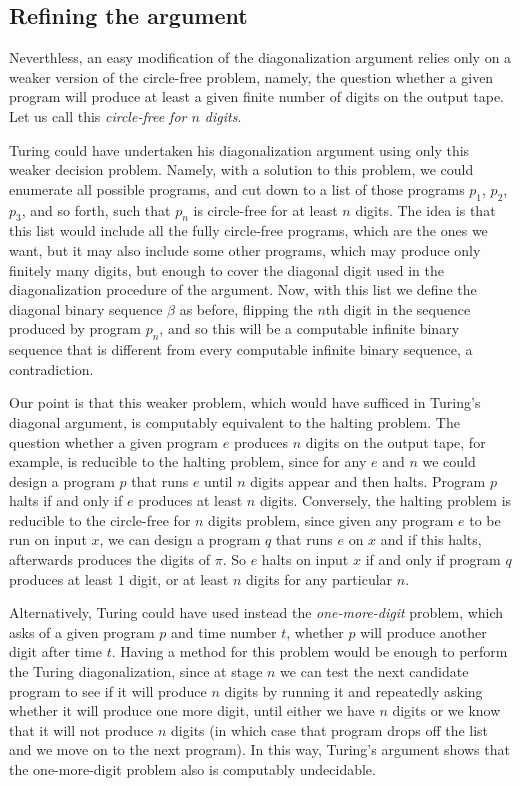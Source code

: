 \documentclass{amsart}
\begin{document}
\subsection{Refining the argument}

Neverthless, an easy modification of the diagonalization argument relies only on a weaker version of the circle-free problem, namely, the question whether a given program will produce at least a given finite number of digits on the output tape. Let us call this \emph{circle-free for $n$ digits}. 

Turing could have undertaken his diagonalization argument using only this weaker decision problem. Namely, with a solution to this problem, we could enumerate all possible programs, and cut down to a list of those programs $p_1$, $p_2$, $p_3$, and so forth, such that $p_n$ is circle-free for at least $n$ digits. The idea is that this list would include all the fully circle-free programs, which are the ones we want, but it may also include 
some other programs, which may produce only finitely many digits, but enough to cover the diagonal digit used in the diagonalization procedure of the argument. Now, with this list we define the diagonal binary sequence $\beta$ as before, flipping the $n$th digit in the sequence produced by program $p_n$, and so this will be a computable infinite binary sequence that is different from every computable infinite binary sequence, a contradiction. 

Our point is that this weaker problem, which would have sufficed in Turing's diagonal argument, is computably equivalent to the halting problem. The question whether a given program $e$ produces $n$ digits on the output tape, for example, is reducible to the halting problem, since for any $e$ and $n$ we could design a program $p$ that runs $e$ until $n$ digits appear and then halts. Program $p$ halts if and only if $e$ produces at least $n$ digits. Conversely, the halting problem is reducible to the circle-free for $n$ digits problem, since given any program $e$ to be run on input $x$, we can design a program $q$ that runs $e$ on $x$ and if this halts, afterwards produces the digits of $\pi$. So $e$ halts on input $x$ if and only if program $q$ produces at least $1$ digit, or at least $n$ digits for any particular $n$.

Alternatively, Turing could have used instead the \emph{one-more-digit} problem, which asks of a given program $p$ and time number $t$, whether $p$ will produce another digit after time $t$. Having a method for this problem would be enough to perform the Turing diagonalization, since at stage $n$ we can test the next candidate program to see if it will produce $n$ digits by running it and repeatedly asking whether it will produce one more digit, until either we have $n$ digits or we know that it will not produce $n$ digits (in which case that program drops off the list and we move on to the next program). In this way, Turing's argument shows that the one-more-digit problem also is computably undecidable.
\end{document}
